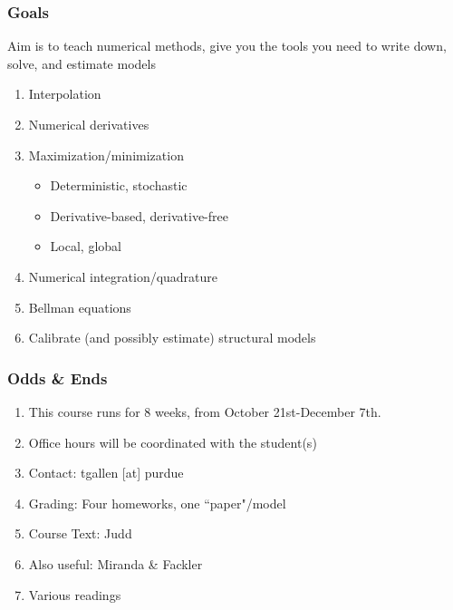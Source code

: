 \documentclass{beamer}
\author{Trevor Gallen}
\date{}
\begin{document}
\begin{frame}
\titlepage
\end{frame}

\begin{frame}
\frametitle[alignment=center]{Goals}
Aim is to teach numerical methods, give you the tools you need to write down, solve, and estimate models
\bigskip
\begin{enumerate}
\item Interpolation 
\bigskip
\item Numerical derivatives
\bigskip
\item Maximization/minimization 
\bigskip
\begin{itemize}
\item Deterministic, stochastic 
\bigskip
\item Derivative-based, derivative-free
\bigskip
\item Local, global
\bigskip
\end{itemize}
\item Numerical integration/quadrature
\bigskip
\item Bellman equations 
\bigskip
\item Calibrate (and possibly estimate) structural models 
\end{enumerate}
\end{frame}

\begin{frame}
\frametitle[alignment=center]{Odds \& Ends}
\begin{enumerate}
\item This course runs for 8 weeks, from October 21st-December 7th.\\
\bigskip
\item Office hours will be coordinated with the student(s)
\bigskip
\bigskip
\item Contact:  tgallen [at] purdue
\bigskip
\item Grading:  Four homeworks, one ``paper"/model
\bigskip
\item Course Text:  Judd
\bigskip
\item Also useful:  Miranda \& Fackler
\bigskip
\item Various readings
\end{enumerate}
\end{frame}
\end{document}
